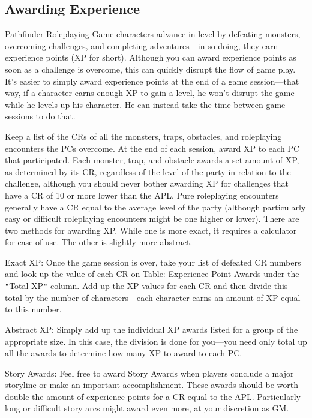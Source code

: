 \subsection{Awarding Experience}

								
Pathfinder Roleplaying Game characters advance in level by defeating monsters, overcoming challenges, and completing adventures---in so doing, they earn experience points (XP for short). Although you can award experience points as soon as a challenge is overcome, this can quickly disrupt the flow of game play. It's easier to simply award experience points at the end of a game session---that way, if a character earns enough XP to gain a level, he won't disrupt the game while he levels up his character. He can instead take the time between game sessions to do that.
				
Keep a list of the CRs of all the monsters, traps, obstacles, and roleplaying encounters the PCs overcome. At the end of each session, award XP to each PC that participated. Each monster, trap, and obstacle awards a set amount of XP, as determined by its CR, regardless of the level of the party in relation to the challenge, although you should never bother awarding XP for challenges that have a CR of 10 or more lower than the APL. Pure roleplaying encounters generally have a CR equal to the average level of the party (although particularly easy or difficult roleplaying encounters might be one higher or lower). There are two methods for awarding XP. While one is more exact, it requires a calculator for ease of use. The other is slightly more abstract.
				
Exact XP: Once the game session is over, take your list of defeated CR numbers and look up the value of each CR on Table: Experience Point Awards under the \texttt{{}"{}}Total XP\texttt{{}"{}} column. Add up the XP values for each CR and then divide this total by the number of characters---each character earns an amount of XP equal to this number.
				
Abstract XP: Simply add up the individual XP awards listed for a group of the appropriate size. In this case, the division is done for you---you need only total up all the awards to determine how many XP to award to each PC.
				
Story Awards: Feel free to award Story Awards when players conclude a major storyline or make an important accomplishment. These awards should be worth double the amount of experience points for a CR equal to the APL. Particularly long or difficult story arcs might award even more, at your discretion as GM.
								
